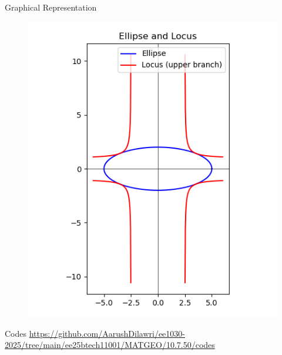 \documentclass{beamer}
\begin{document}
\begin{frame}{Graphical Representation}
\begin{figure}[H]
\begin{center}
\includegraphics[width=0.6\columnwidth]{figs/fig.png}
\end{center}
\caption{}
\label{fig:Fig1}
\end{figure}
\end{frame}

\begin{frame}{Codes}
\url{https://github.com/AarushDilawri/ee1030-2025/tree/main/ee25btech11001/MATGEO/10.7.50/codes}
\end{frame}
\end{document}
